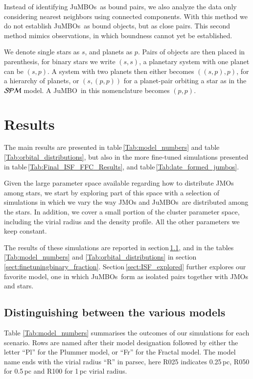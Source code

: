 \documentclass[submission,phys]{lib/SciPost}
\newcommand{\jumbo}{\mbox{JuMBO}}
\newcommand{\jumbos}{\mbox{JuMBOs}}
\begin{document}
Instead of identifying \jumbos\, as bound pairs, we also analyze the
data only considering nearest neighbors using connected components. With
this method we do not establish \jumbos\, as bound objects, but as
close pairs. This second method mimics observations, in which
boundness cannot yet be established.

We denote single stars as $s$, and planets as $p$. Pairs of
objects are then placed in parenthesis, for binary stars we write
$(s,s)$, a planetary system with one planet can be $(s,p)$.  A system
with two planets then either becomes $((s,p),p)$, for a hierarchy of
planets, or $(s,(p,p))$ for a planet-pair orbiting a star as in the
${\cal SPM}$ model. A \jumbo\, in this nomenclature becomes $(p,p)$.

\section{Results}\label{Sect:Results}

The main results are presented in table\,\ref{Tab:model_numbers} and
table\,\ref{Tab:orbital_distributions}, but also in the more
fine-tuned simulations presented in
table\,\ref{Tab:Final_ISF_FFC_Results}, and
table\,\ref{Tab:late_formed_jumbos}.

Given the large parameter space available regarding how to distribute JMOs
among stars, we start by exploring part of this space with a selection of 
simulations in which we vary the way JMOs and \jumbos\, are distributed among 
the stars. In addition, we cover a small portion of the cluster parameter
space, including the virial radius and the density profile. All the
other parameters we keep constant.

The results of these simulations are reported in
section\,\ref{sect:model_selection}, and in the
tables\,\ref{Tab:model_numbers} and \ref{Tab:orbital_distributions} in
section\,\ref{sect:finetuningbinary_fraction}. Section\,\ref{sect:ISF_explored}
further explores our favorite model, one in which
\jumbos\, form as isolated pairs together with JMOs and stars.

\subsection{Distinguishing between the various models}\label{sect:model_selection}


Table \ref{Tab:model_numbers} summarises the outcomes of our simulations for each scenario.  Rows are named after
their model designation followed by either the letter ``Pl'' for the
Plummer model, or ``Fr'' for the Fractal model.  The model name ends
with the virial radius ``R'' in parsec, here R025 indicates 0.25\,pc,
R050 for 0.5\,pc and R100 for 1\,pc virial radius.
\end{document}
